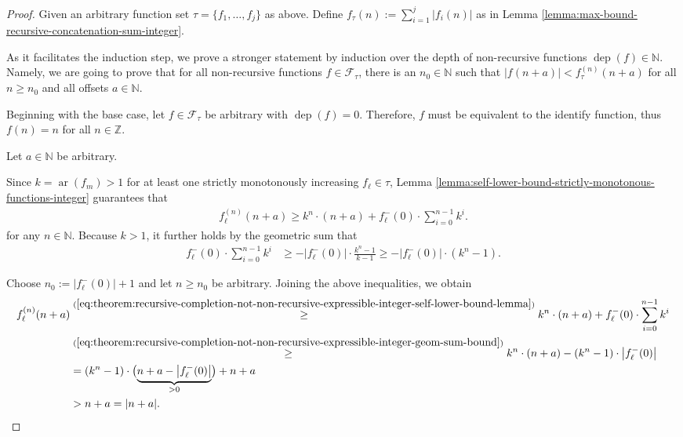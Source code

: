 \begin{proof}
	Given an arbitrary function set $\tau=\{f_1,\dots,f_j\}$ as above.
	Define $f_\tau(n):=\sum_{i=1}^{j}|f_i(n)|$ as in Lemma \ref{lemma:max-bound-recursive-concatenation-sum-integer}.
	
	As it facilitates the induction step, we prove a stronger statement by induction over the depth of non-recursive functions $\operatorname{dep}(f)\in\mathbb{N}$.
	Namely, we are going to prove that for all non-recursive functions $f\in\mathcal{F}_{\tau}$, there is an $n_0\in\mathbb{N}$ such that $|f(n+a)|<f_{\tau}^{(n)}(n+a)$ for all $n\geq n_0$ and all offsets $a\in\mathbb{N}$.
	
	Beginning with the base case, let $f\in\mathcal{F}_{\tau}$ be arbitrary with $\operatorname{dep}(f)=0$.
	Therefore, $f$ must be equivalent to the identify function, thus $f(n)=n$ for all $n\in\mathbb{Z}$.
	
	Let $a\in\mathbb{N}$ be arbitrary.	
	
	Since $k=\operatorname{ar}(f_m)>1$ for at least one strictly monotonously increasing $f_{\ell}\in\tau$, Lemma \ref{lemma:self-lower-bound-strictly-monotonous-functions-integer} guarantees that
	\begin{align}
		\label{eq:theorem:recursive-completion-not-non-recursive-expressible-integer-self-lower-bound-lemma}
		f_{\ell}^{(n)}(n+a) \geq k^n\cdot (n+a) + f_{\ell}^{-}(0)\cdot\sum_{i=0}^{n-1}k^i. %
	\end{align}
	for any $n\in\mathbb{N}$.
	Because $k>1$, it further holds by the geometric sum that
	\begin{align}
		\label{eq:theorem:recursive-completion-not-non-recursive-expressible-integer-geom-sum-bound}
		f_{\ell}^{-}(0)\cdot\sum_{i=0}^{n-1}k^i & \geq  -\bigl|f_{\ell}^{-}(0)\bigr|\cdot \frac{k^n-1}{k-1} \geq -\bigl|f_{\ell}^{-}(0)\bigr|\cdot(k^n-1).
	\end{align}
	
	Choose $n_0:=|f_{\ell}^{-}(0)|+1$ and let $n\geq n_0$ be arbitrary.
	Joining the above inequalities, we obtain
	\begin{align}
		\label{eq:theorem:recursive-completion-not-non-recursive-expressible-integer-self-lower-bound}
		f_{\ell}^{(n)}(n+a) &\overset{(\ref{eq:theorem:recursive-completion-not-non-recursive-expressible-integer-self-lower-bound-lemma})}{\geq} k^n\cdot (n+a) + f_{\ell}^{-}(0)\cdot\sum_{i=0}^{n-1}k^i\\
		&\overset{(\ref{eq:theorem:recursive-completion-not-non-recursive-expressible-integer-geom-sum-bound})}{\geq} k^n\cdot (n+a) -(k^n-1)\cdot \bigl|f_{\ell}^{-}(0)\bigr| \\
		&= (k^n-1)\cdot\bigl(\underbrace{n+a-\bigl|f_{\ell}^{-}(0)\bigr|}_{> 0}\bigr) + n+a\\
		&> n+a = |n+a|.
	\end{align}
	

\end{proof}
